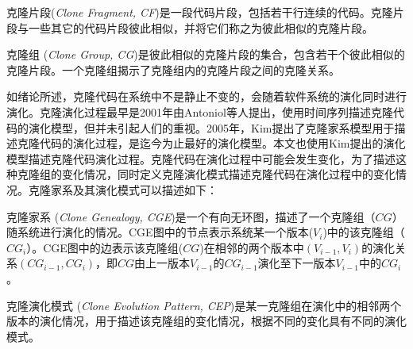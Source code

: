 \begin{definition} 
[{克隆片段}]
\label {defn-clonefragment}
克隆片段({\em Clone Fragment, CF})是一段代码片段，包括若干行连续的代码。克隆片段与一些其它的代码片段彼此相似，并将它们称之为彼此相似的克隆片段。
\end {definition}

\begin{definition}
 [{克隆组}]
\label {def-clonegroup}
克隆组 ({\em Clone Group, CG})是彼此相似的克隆片段的集合，包含若干个彼此相似的克隆片段。一个克隆组揭示了克隆组内的克隆片段之间的克隆关系。
\end {definition}


如绪论所述，克隆代码在系统中不是静止不变的，会随着软件系统的演化同时进行演化。克隆演化过程最早是2001年由Antoniol等人提出，使用时间序列描述克隆代码的演化模型\cite{antoniol2001modeling}，但并未引起人们的重视。2005年，Kim提出了克隆家系模型用于描述克隆代码的演化过程，是迄今为止最好的演化模型\cite{kim2005empirical}。本文也使用Kim提出的演化模型描述克隆代码演化过程。克隆代码在演化过程中可能会发生变化，为了描述这种克隆组的变化情况，同时定义克隆演化模式描述克隆代码在演化过程中的变化情况。克隆家系及其演化模式可以描述如下：\\

\begin{definition}
 [{克隆家系}]
\label {def-clonegenealpgy}
克隆家系 ({\em Clone Genealogy, CGE})是一个有向无环图，描述了一个克隆组（$CG$）随系统进行演化的情况。CGE图中的节点表示系统某一个版本($V_i$)中的该克隆组（$CG_i$）。CGE图中的边表示该克隆组($CG$)在相邻的两个版本中$(V_{i-1},V_i )$的演化关系$(CG_{i-1},CG_{i})$，即$CG$由上一版本$V_{i-1}$的$CG_{i-1}$演化至下一版本$V_{i-1}$中的$CG_{i}$。
\end{definition} 

\begin{definition}
 [{克隆演化模式}]
\label {def-evolutionpattern}
克隆演化模式 ({\em Clone Evolution Pattern, CEP})是某一克隆组在演化中的相邻两个版本的演化情况，用于描述该克隆组的变化情况，根据不同的变化具有不同的演化模式。
\end{definition} 

